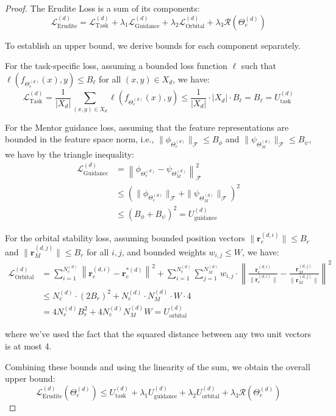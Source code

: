 \begin{proof}
The Erudite Loss is a sum of its components:
\begin{equation}
\mathcal{L}_{\text{Erudite}}^{(d)} = \mathcal{L}_{\text{Task}}^{(d)} + \lambda_1 \mathcal{L}_{\text{Guidance}}^{(d)} + \lambda_2 \mathcal{L}_{\text{Orbital}}^{(d)} + \lambda_3 \mathcal{R}(\Theta_e^{(d)})
\end{equation}

To establish an upper bound, we derive bounds for each component separately.

For the task-specific loss, assuming a bounded loss function $\ell$ such that $\ell(f_{\Theta_e^{(d)}}(x), y) \leq B_{\ell}$ for all $(x,y) \in X_d$, we have:
\begin{equation}
\mathcal{L}_{\text{Task}}^{(d)} = \frac{1}{|X_d|}\sum_{(x,y) \in X_d} \ell\left(f_{\Theta_e^{(d)}}(x), y\right) \leq \frac{1}{|X_d|} \cdot |X_d| \cdot B_{\ell} = B_{\ell} = U_{\text{task}}^{(d)}
\end{equation}

For the Mentor guidance loss, assuming that the feature representations are bounded in the feature space norm, i.e., $\|\phi_{\Theta_e^{(d)}}\|_{\mathcal{F}} \leq B_{\phi}$ and $\|\psi_{\Theta_M^{(d)}}\|_{\mathcal{F}} \leq B_{\psi}$, we have by the triangle inequality:
\begin{align}
\mathcal{L}_{\text{Guidance}}^{(d)} &= \left\|\phi_{\Theta_e^{(d)}} - \psi_{\Theta_M^{(d)}}\right\|^2_{\mathcal{F}} \\
&\leq \left(\|\phi_{\Theta_e^{(d)}}\|_{\mathcal{F}} + \|\psi_{\Theta_M^{(d)}}\|_{\mathcal{F}}\right)^2 \\
&\leq (B_{\phi} + B_{\psi})^2 = U_{\text{guidance}}^{(d)}
\end{align}

For the orbital stability loss, assuming bounded position vectors $\|\mathbf{r}_e^{(d,i)}\| \leq B_r$ and $\|\mathbf{r}_M^{(d,j)}\| \leq B_r$ for all $i, j$, and bounded weights $w_{i,j} \leq W$, we have:
\begin{align}
\mathcal{L}_{\text{Orbital}}^{(d)} &= \sum_{i=1}^{N_e^{(d)}} \left\|\mathbf{r}_e^{(d,i)} - \mathbf{r}_e^{*(d)}\right\|^2 + \sum_{i=1}^{N_e^{(d)}} \sum_{j=1}^{N_M^{(d)}} w_{i,j} \cdot \left\|\frac{\mathbf{r}_e^{(d,i)}}{\|\mathbf{r}_e^{(d,i)}\|} - \frac{\mathbf{r}_M^{(d,j)}}{\|\mathbf{r}_M^{(d,j)}\|}\right\|^2 \\
&\leq N_e^{(d)} \cdot (2B_r)^2 + N_e^{(d)} \cdot N_M^{(d)} \cdot W \cdot 4 \\
&= 4N_e^{(d)}B_r^2 + 4N_e^{(d)}N_M^{(d)}W = U_{\text{orbital}}^{(d)}
\end{align}

where we've used the fact that the squared distance between any two unit vectors is at most 4.

Combining these bounds and using the linearity of the sum, we obtain the overall upper bound:
\begin{equation}
\mathcal{L}_{\text{Erudite}}^{(d)}(\Theta_e^{(d)}) \leq U_{\text{task}}^{(d)} + \lambda_1 U_{\text{guidance}}^{(d)} + \lambda_2 U_{\text{orbital}}^{(d)} + \lambda_3 \mathcal{R}(\Theta_e^{(d)})
\end{equation}
\end{proof}

